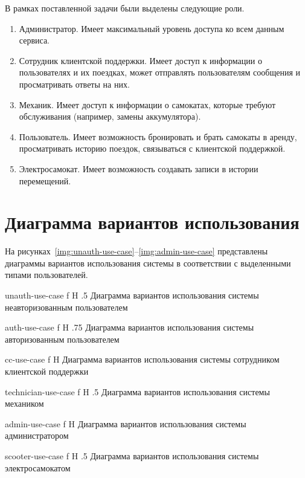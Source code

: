 В рамках поставленной задачи были выделены следующие роли.

\begin{enumerate}
    \item Администратор. Имеет максимальный уровень доступа ко всем данным сервиса.
    \item Сотрудник клиентской поддержки. Имеет доступ к информации о пользователях и их поездках, может отправлять пользователям сообщения и просматривать ответы на них.
    \item Механик. Имеет доступ к информации о самокатах, которые требуют обслуживания (например, замены аккумулятора).
    \item Пользователь. Имеет возможность бронировать и брать самокаты в аренду, просматривать историю поездок, связываться с клиентской поддержкой.
    \item Электросамокат. Имеет возможность создавать записи в истории перемещений.
\end{enumerate}

\section{Диаграмма вариантов использования}

На рисунках~\ref{img:unauth-use-case}--\ref{img:admin-use-case} представлены диаграммы вариантов использования системы в соответствии с выделенными типами пользователей.

    {unauth-use-case}
    {f}
    {H}
    {.5\textwidth}
    {Диаграмма вариантов использования системы неавторизованным пользователем}

    {auth-use-case}
    {f}
    {H}
    {.75\textwidth}
    {Диаграмма вариантов использования системы авторизованным пользователем}

    {cc-use-case}
    {f}
    {H}
    {\textwidth}
    {Диаграмма вариантов использования системы сотрудником клиентской поддержки}

    {technician-use-case}
    {f}
    {H}
    {.5\textwidth}
    {Диаграмма вариантов использования системы механиком}

    {admin-use-case}
    {f}
    {H}
    {\textwidth}
    {Диаграмма вариантов использования системы администратором}

    {scooter-use-case}
    {f}
    {H}
    {.5\textwidth}
    {Диаграмма вариантов использования системы электросамокатом}

